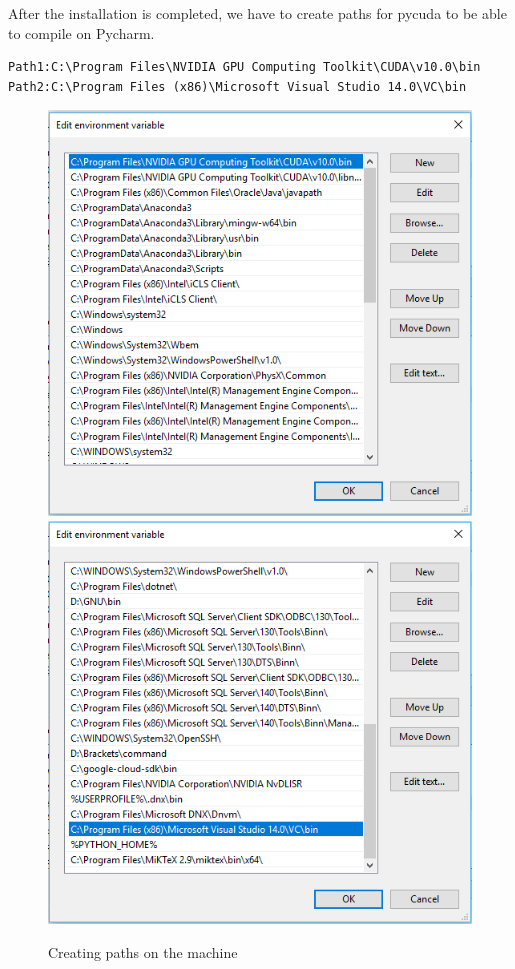 \documentclass[11pt]{article}
\begin{document}
\newpage
After the installation is completed, we have to create paths for pycuda to be able to compile on Pycharm.
\begin{lstlisting}
Path1:C:\Program Files\NVIDIA GPU Computing Toolkit\CUDA\v10.0\bin
Path2:C:\Program Files (x86)\Microsoft Visual Studio 14.0\VC\bin
\end{lstlisting}
\begin{figure}[h]
\centering
\includegraphics[scale=0.585]{path1}
\includegraphics[scale=0.585]{path2}
\caption{Creating paths on the machine}
\end{figure}
\end{document}
